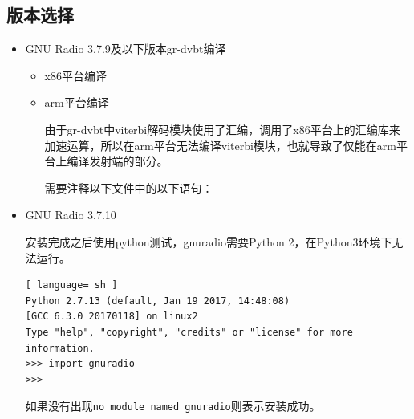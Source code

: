 	\subsection{版本选择}
		\begin{itemize}
			\item GNU Radio 3.7.9及以下版本gr-dvbt编译
				\begin{itemize}
					\item x86平台编译
					\item arm平台编译
					\par 由于gr-dvbt中viterbi解码模块使用了汇编，调用了x86平台上的汇编库来加速运算，所以在arm平台无法编译viterbi模块，也就导致了仅能在arm平台上编译发射端的部分。
					\par 需要注释以下文件中的以下语句：
				\end{itemize}
			\item GNU Radio 3.7.10
				\par 安装完成之后使用python测试，gnuradio需要Python 2，在Python3环境下无法运行。
\begin{lstlisting}[ language= sh ]
Python 2.7.13 (default, Jan 19 2017, 14:48:08) 
[GCC 6.3.0 20170118] on linux2
Type "help", "copyright", "credits" or "license" for more information.
>>> import gnuradio
>>> 
\end{lstlisting}
				\par 如果没有出现\lstinline[language=sh]{no module named gnuradio}则表示安装成功。
		\end{itemize}
\endinput